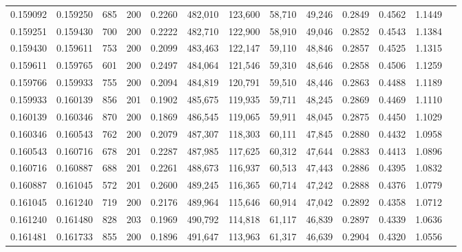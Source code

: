 \begin{tabular}{rrrrrrrrrrrrr}
0.159092 & 0.159250 &    685 & 200 &                                     0.2260 & 482,010 & 123,600 &  58,710 &  49,246 & 0.2849 & 0.4562 & 1.1449 \\
0.159251 & 0.159430 &    700 & 200 &                                     0.2222 & 482,710 & 122,900 &  58,910 &  49,046 & 0.2852 & 0.4543 & 1.1384 \\
0.159430 & 0.159611 &    753 & 200 &                                     0.2099 & 483,463 & 122,147 &  59,110 &  48,846 & 0.2857 & 0.4525 & 1.1315 \\
0.159611 & 0.159765 &    601 & 200 &                                     0.2497 & 484,064 & 121,546 &  59,310 &  48,646 & 0.2858 & 0.4506 & 1.1259 \\
0.159766 & 0.159933 &    755 & 200 &                                     0.2094 & 484,819 & 120,791 &  59,510 &  48,446 & 0.2863 & 0.4488 & 1.1189 \\
0.159933 & 0.160139 &    856 & 201 &                                     0.1902 & 485,675 & 119,935 &  59,711 &  48,245 & 0.2869 & 0.4469 & 1.1110 \\
0.160139 & 0.160346 &    870 & 200 &                                     0.1869 & 486,545 & 119,065 &  59,911 &  48,045 & 0.2875 & 0.4450 & 1.1029 \\
0.160346 & 0.160543 &    762 & 200 &                                     0.2079 & 487,307 & 118,303 &  60,111 &  47,845 & 0.2880 & 0.4432 & 1.0958 \\
0.160543 & 0.160716 &    678 & 201 &                                     0.2287 & 487,985 & 117,625 &  60,312 &  47,644 & 0.2883 & 0.4413 & 1.0896 \\
0.160716 & 0.160887 &    688 & 201 &                                     0.2261 & 488,673 & 116,937 &  60,513 &  47,443 & 0.2886 & 0.4395 & 1.0832 \\
0.160887 & 0.161045 &    572 & 201 &                                     0.2600 & 489,245 & 116,365 &  60,714 &  47,242 & 0.2888 & 0.4376 & 1.0779 \\
0.161045 & 0.161240 &    719 & 200 &                                     0.2176 & 489,964 & 115,646 &  60,914 &  47,042 & 0.2892 & 0.4358 & 1.0712 \\
0.161240 & 0.161480 &    828 & 203 &                                     0.1969 & 490,792 & 114,818 &  61,117 &  46,839 & 0.2897 & 0.4339 & 1.0636 \\
0.161481 & 0.161733 &    855 & 200 &                                     0.1896 & 491,647 & 113,963 &  61,317 &  46,639 & 0.2904 & 0.4320 & 1.0556 \\

\end{tabular}

